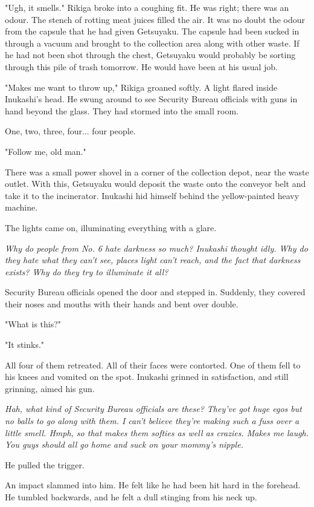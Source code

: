 "Ugh, it smells." Rikiga broke into a coughing fit. He was right; there
was an odour. The stench of rotting meat juices filled the air. It was
no doubt the odour from the capsule that he had given Getsuyaku. The
capsule had been sucked in through a vacuum and brought to the
collection area along with other waste. If he had not been shot through
the chest, Getsuyaku would probably be sorting through this pile of
trash tomorrow. He would have been at his usual job.

"Makes me want to throw up," Rikiga groaned softly. A light flared
inside Inukashi's head. He swung around to see Security Bureau officials
with guns in hand beyond the glass. They had stormed into the small
room.

One, two, three, four... four people.

"Follow me, old man."

There was a small power shovel in a corner of the collection depot, near
the waste outlet. With this, Getsuyaku would deposit the waste onto the
conveyor belt and take it to the incinerator. Inukashi hid himself
behind the yellow-painted heavy machine.

The lights came on, illuminating everything with a glare.

\emph{Why do people from No. 6 hate darkness so much? Inukashi thought idly.
Why do they hate what they can't see, places light can't reach, and the
fact that darkness exists? Why do they try to illuminate it all?}

Security Bureau officials opened the door and stepped in. Suddenly, they
covered their noses and mouths with their hands and bent over double.

"What is this?"

"It stinks."

All four of them retreated. All of their faces were contorted. One of
them fell to his knees and vomited on the spot. Inukashi grinned in
satisfaction, and still grinning, aimed his gun.

\emph{Hah, what kind of Security Bureau officials are these? They've got huge
egos but no balls to go along with them. I can't believe they're making
such a fuss over a little smell. Hmph, so that makes them softies as
well as crazies. Makes me laugh. You guys should all go home and suck on
your mommy's nipple.}

He pulled the trigger.

An impact slammed into him. He felt like he had been hit hard in the
forehead. He tumbled backwards, and he felt a dull stinging from his
neck up.

